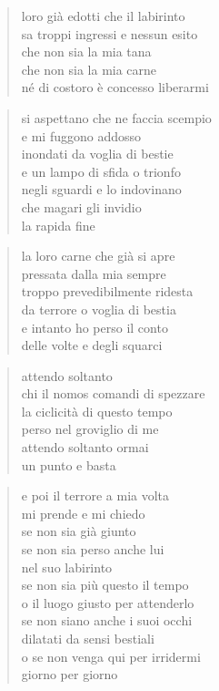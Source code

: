 	\begin{verse}
		loro già edotti che il labirinto\\
		sa troppi ingressi e nessun esito\\
		che non sia la mia tana\\
		che non sia la mia carne\\
		né di costoro è concesso liberarmi
	\end{verse}

	\begin{verse}
		si aspettano che ne faccia scempio\\
		e mi fuggono addosso\\
		inondati da voglia di bestie\\
		e un lampo di sfida o trionfo\\
		negli sguardi e lo indovinano\\
		che magari gli invidio\\
		la rapida fine
	\end{verse}

	\begin{verse}
		la loro carne che già si apre\\
		pressata dalla mia sempre\\
		troppo prevedibilmente ridesta\\
		da terrore o voglia di bestia\\
		e intanto ho perso il conto\\
		delle volte e degli squarci
	\end{verse}

	\begin{verse}
		attendo soltanto\\
		chi il nomos comandi di spezzare\\
		la ciclicità di questo tempo\\
		perso nel groviglio di me\\
		attendo soltanto ormai\\
		un punto e basta
	\end{verse}

	\begin{verse}
		e poi il terrore a mia volta\\
		mi prende e mi chiedo\\
		se non sia già giunto\\
		se non sia perso anche lui\\
		nel suo labirinto\\
		se non sia più questo il tempo\\
		o il luogo giusto per attenderlo\\
		se non siano anche i suoi occhi\\
		dilatati da sensi bestiali\\
		o se non venga qui per irridermi\\
		giorno per giorno
	\end{verse}

